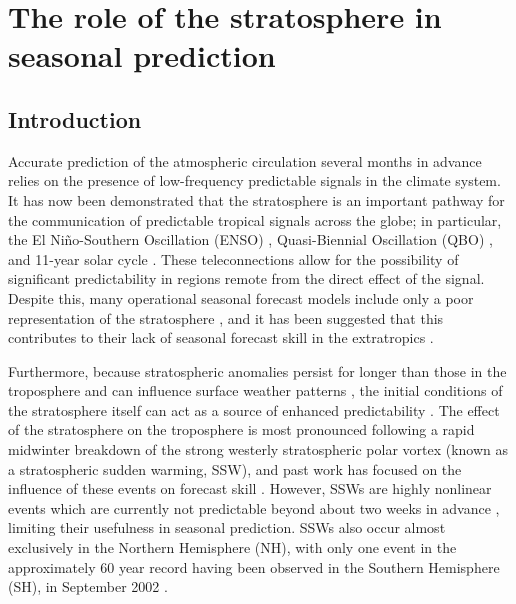 \chapter{The role of the stratosphere in seasonal prediction} 

\section{Introduction}

Accurate prediction of the atmospheric circulation several months in advance relies on the presence of low-frequency predictable signals in the climate system. It has now been demonstrated that the stratosphere is an important pathway for the communication of predictable tropical signals across the globe; in particular, the El Ni\~no-Southern Oscillation (ENSO) \citep{Pascoe2006, Bell2009, Ineson2009, Hurwitz2011}, Quasi-Biennial Oscillation (QBO) \citep{Marshall2009, Garfinkel2011}, and 11-year solar cycle \citep{Kodera2002, Gray2013}. These teleconnections allow for the possibility of significant predictability in regions remote from the direct effect of the signal. Despite this, many operational seasonal forecast models include only a poor representation of the stratosphere \citep{Maycock2011}, and it has been suggested that this contributes to their lack of seasonal forecast skill in the extratropics \citep{Smith2012}. 

Furthermore, because stratospheric anomalies persist for longer than those in the troposphere and can influence surface weather patterns \citep[e.g.,][]{Baldwin2001a}, the initial conditions of the stratosphere itself can act as a source of enhanced predictability \citep{Baldwin2003a, Charlton2003, Hardiman2011}. The effect of the stratosphere on the troposphere is most pronounced following a rapid midwinter breakdown of the strong westerly stratospheric polar vortex (known as a stratospheric sudden warming, SSW), and past work has focused on the influence of these events on forecast skill \citep{Kuroda2008, Sigmond2013}. However, SSWs are highly nonlinear events which are currently not predictable beyond about two weeks in advance \citep{Marshall2010}, limiting their usefulness in seasonal prediction. SSWs also occur almost exclusively in the Northern Hemisphere (NH), with only one event in the approximately 60 year record having been observed in the Southern Hemisphere (SH), in September 2002 \citep{Roscoe2005}.

